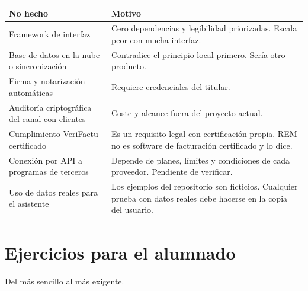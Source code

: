 {\def\LTcaptype{none} %
\begin{longtable}[]{@{}
  >{\raggedright\arraybackslash}p{}
  >{\raggedright\arraybackslash}p{}@{}}
\toprule\noalign{}
\begin{minipage}[b]{\linewidth}\raggedright
No hecho
\end{minipage} & \begin{minipage}[b]{\linewidth}\raggedright
Motivo
\end{minipage} \\
\midrule\noalign{}
\endhead
\bottomrule\noalign{}
\endlastfoot
Framework de interfaz & Cero dependencias y legibilidad priorizadas. Escala peor con mucha interfaz. \\
Base de datos en la nube o sincronización & Contradice el principio local primero. Sería otro producto. \\
Firma y notarización automáticas & Requiere credenciales del titular. \\
Auditoría criptográfica del canal con clientes & Coste y alcance fuera del proyecto actual. \\
Cumplimiento VeriFactu certificado & Es un requisito legal con certificación propia. REM no es software de facturación certificado y lo dice. \\
Conexión por API a programas de terceros & Depende de planes, límites y condiciones de cada proveedor. Pendiente de verificar. \\
Uso de datos reales para el asistente & Los ejemplos del repositorio son ficticios. Cualquier prueba con datos reales debe hacerse en la copia del usuario. \\
\end{longtable}
}

\chapter{Ejercicios para el alumnado}\label{ejercicios-para-el-alumnado}

Del más sencillo al más exigente.

